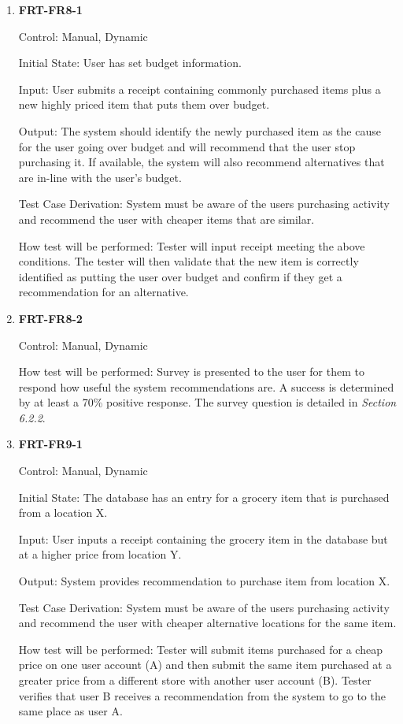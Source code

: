 \documentclass[12pt, titlepage]{article}
\begin{document}
\begin{enumerate}

\item{\textbf{FRT-FR8-1}}

Control: Manual, Dynamic
          
Initial State: User has set budget information.

Input: User submits a receipt containing commonly purchased items plus a new highly priced item that puts them over budget.
          
Output: The system should identify the newly purchased item as the cause for the user going over budget and will recommend that the user stop purchasing it. If available, the system will also recommend alternatives that are in-line with the user's budget.

Test Case Derivation: System must be aware of the users purchasing activity and recommend the user with cheaper items that are similar.
          
How test will be performed: Tester will input receipt meeting the above conditions. The tester will then validate that the new item is correctly identified as putting the user over budget and confirm if they get a recommendation for an alternative.

\item{\textbf{FRT-FR8-2}}

Control: Manual, Dynamic

How test will be performed: Survey is presented to the user for them to respond how useful the system recommendations are. A success is determined by at least a 70\% positive response. The survey question is detailed in \textit{Section 6.2.2}.

\item{\textbf{FRT-FR9-1}}

Control: Manual, Dynamic
          
Initial State: The database has an entry for a grocery item that is purchased from a location X.

Input: User inputs a receipt containing the grocery item in the database but at a higher price from location Y.
          
Output: System provides recommendation to purchase item from location X.

Test Case Derivation: System must be aware of the users purchasing activity and recommend the user with cheaper alternative locations for the same item.
          
How test will be performed: Tester will submit items purchased for a cheap price on one user account (A) and then submit the same item purchased at a greater price from a different store with another user account (B). Tester verifies that user B receives a recommendation from the system to go to the same place as user A.


\end{enumerate}
\end{document}
